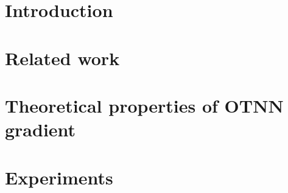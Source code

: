 \documentclass{article}
\newcommand{\commentblue}[1]{
    \textcolor{blue}{Mathieu : #1 }
}
\begin{document}
\begin{abstract}

\end{abstract}


\section{Introduction}
\label{sec:introduction}



\section{Related work}
\label{sec:related_work}



\section{Theoretical properties of OTNN gradient}
\label{sec:ot_rob_explain}


%
\section{Experiments}
\label{sec:experiments}


\end{document}
